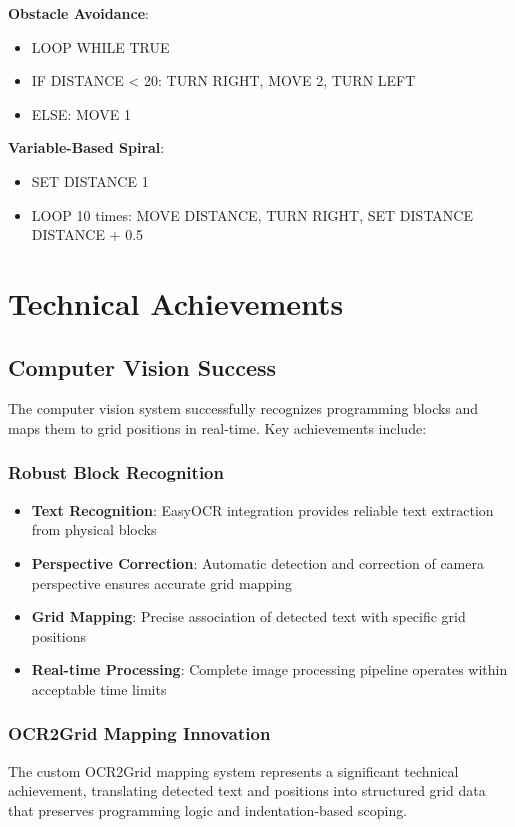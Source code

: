 \textbf{Obstacle Avoidance}:
\begin{itemize}
    \item LOOP WHILE TRUE
    \item IF DISTANCE < 20: TURN RIGHT, MOVE 2, TURN LEFT
    \item ELSE: MOVE 1
\end{itemize}

\textbf{Variable-Based Spiral}:
\begin{itemize}
    \item SET DISTANCE 1
    \item LOOP 10 times: MOVE DISTANCE, TURN RIGHT, SET DISTANCE DISTANCE + 0.5
\end{itemize}

\section{Technical Achievements}

\subsection{Computer Vision Success}

The computer vision system successfully recognizes programming blocks and maps them to grid positions in real-time. Key achievements include:

\subsubsection{Robust Block Recognition}
\begin{itemize}
    \item \textbf{Text Recognition}: EasyOCR integration provides reliable text extraction from physical blocks
    \item \textbf{Perspective Correction}: Automatic detection and correction of camera perspective ensures accurate grid mapping
    \item \textbf{Grid Mapping}: Precise association of detected text with specific grid positions
    \item \textbf{Real-time Processing}: Complete image processing pipeline operates within acceptable time limits
\end{itemize}

\subsubsection{OCR2Grid Mapping Innovation}
The custom OCR2Grid mapping system represents a significant technical achievement, translating detected text and positions into structured grid data that preserves programming logic and indentation-based scoping.

